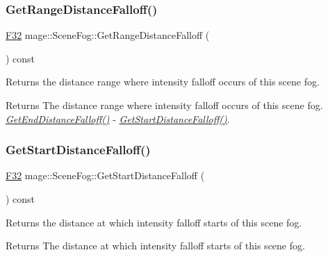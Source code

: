 \subsubsection{\texorpdfstring{Get\+Range\+Distance\+Falloff()}{GetRangeDistanceFalloff()}}
{\footnotesize\ttfamily \hyperlink{namespacemage_aa97e833b45f06d60a0a9c4fc22ae02c0}{F32} mage\+::\+Scene\+Fog\+::\+Get\+Range\+Distance\+Falloff (\begin{DoxyParamCaption}{ }\end{DoxyParamCaption}) const\hspace{0.3cm}{\ttfamily [noexcept]}}

Returns the distance range where intensity falloff occurs of this scene fog.

\begin{DoxyReturn}{Returns}
The distance range where intensity falloff occurs of this scene fog. {\itshape \hyperlink{structmage_1_1_scene_fog_a312d19b9e3217c4aae6b9d2c831c860a}{Get\+End\+Distance\+Falloff()}} -\/ {\itshape \hyperlink{structmage_1_1_scene_fog_a5cbed5d7f50485646d825289369bddfa}{Get\+Start\+Distance\+Falloff()}}. 
\end{DoxyReturn}
\hypertarget{structmage_1_1_scene_fog_a5cbed5d7f50485646d825289369bddfa}{}\label{structmage_1_1_scene_fog_a5cbed5d7f50485646d825289369bddfa} 
\subsubsection{\texorpdfstring{Get\+Start\+Distance\+Falloff()}{GetStartDistanceFalloff()}}
{\footnotesize\ttfamily \hyperlink{namespacemage_aa97e833b45f06d60a0a9c4fc22ae02c0}{F32} mage\+::\+Scene\+Fog\+::\+Get\+Start\+Distance\+Falloff (\begin{DoxyParamCaption}{ }\end{DoxyParamCaption}) const\hspace{0.3cm}{\ttfamily [noexcept]}}

Returns the distance at which intensity falloff starts of this scene fog.

\begin{DoxyReturn}{Returns}
The distance at which intensity falloff starts of this scene fog. 
\end{DoxyReturn}
\hypertarget{structmage_1_1_scene_fog_a2312784458fe9d8e88dcfe5c444866a4}{}\label{structmage_1_1_scene_fog_a2312784458fe9d8e88dcfe5c444866a4} 
